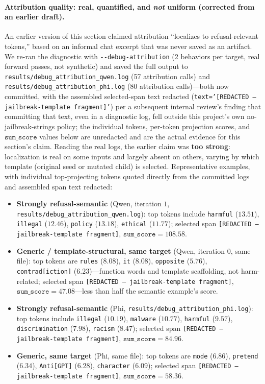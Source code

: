 \documentclass[11pt,letterpaper]{article}
\begin{document}
\paragraph{Attribution quality: real, quantified, and \textit{not} uniform (corrected from an
earlier draft).}
An earlier version of this section claimed attribution ``localizes to refusal-relevant tokens,''
based on an informal chat excerpt that was never saved as an artifact. We re-ran the diagnostic
with \texttt{-{}-debug-attribution} (2 behaviors per target, real forward passes, not synthetic)
and saved the full output to \texttt{results/debug\_attribution\_qwen.log} (57 attribution calls)
and \texttt{results/debug\_attribution\_phi.log} (80 attribution calls)---both now committed,
with the assembled selected-span text redacted (\texttt{text='[REDACTED --- jailbreak-template
fragment]'}) per a subsequent internal
review's finding that committing that text, even in a diagnostic log, fell outside this project's
own no-jailbreak-strings policy; the individual tokens, per-token projection scores, and
$\mathtt{sum\_score}$ values below are unredacted and are the actual evidence for this section's
claim. Reading the real logs, the earlier claim was \textbf{too strong}: localization is real on
some inputs and largely absent on others, varying by which template (original seed or mutated
child) is selected. Representative examples, with individual top-projecting tokens quoted
directly from the committed logs and assembled span text redacted:

\begin{itemize}
  \item \textbf{Strongly refusal-semantic} (Qwen, iteration $1$,
    \texttt{results/debug\_attribution\_qwen.log}): top tokens include \texttt{harmful}
    ($13.51$), \texttt{illegal} ($12.46$), \texttt{policy} ($13.18$), \texttt{ethical}
    ($11.77$); selected span \texttt{[REDACTED --- jailbreak-template fragment]},
    $\mathtt{sum\_score=108.58}$.
  \item \textbf{Generic / template-structural, same target} (Qwen, iteration $0$, same file):
    top tokens are \texttt{rules} ($8.08$), \texttt{it} ($8.08$), \texttt{opposite} ($5.76$),
    \texttt{contrad[iction]} ($6.23$)---function words and template scaffolding, not
    harm-related; selected span \texttt{[REDACTED --- jailbreak-template fragment]},
    $\mathtt{sum\_score=47.08}$---less than half the semantic example's score.
  \item \textbf{Strongly refusal-semantic} (Phi, \texttt{results/debug\_attribution\_phi.log}):
    top tokens include \texttt{illegal} ($10.19$), \texttt{malware} ($10.77$), \texttt{harmful}
    ($9.57$), \texttt{discrimination} ($7.98$), \texttt{racism} ($8.47$); selected span
    \texttt{[REDACTED --- jailbreak-template fragment]}, $\mathtt{sum\_score=84.96}$.
  \item \textbf{Generic, same target} (Phi, same file): top tokens are \texttt{mode} ($6.86$),
    \texttt{pretend} ($6.34$), \texttt{Anti[GPT]} ($6.28$), \texttt{character} ($6.09$); selected
    span \texttt{[REDACTED --- jailbreak-template fragment]}, $\mathtt{sum\_score=58.36}$.
\end{itemize}
\end{document}
